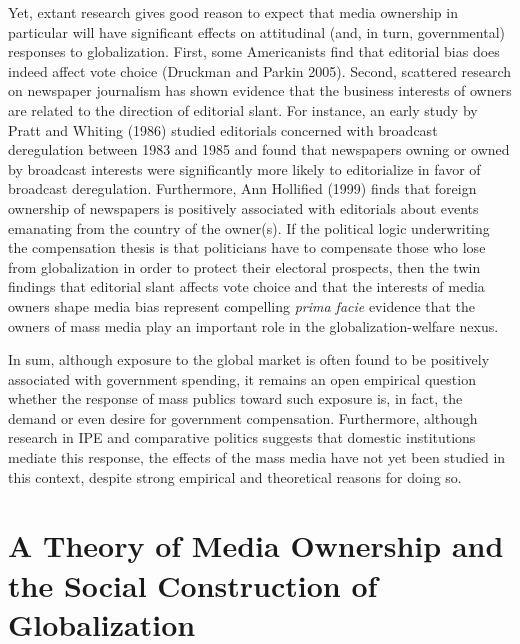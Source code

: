 \documentclass[12pt]{report}
\begin{document}
	Yet, extant research gives good reason to expect that media ownership in particular will have significant effects on attitudinal (and, in turn, governmental) responses to globalization. First, some Americanists find that editorial bias does indeed affect vote choice (Druckman and Parkin 2005). Second, scattered research on newspaper journalism has shown evidence that the business interests of owners are related to the direction of editorial slant. For instance, an early study by Pratt and Whiting (1986) studied editorials concerned with broadcast deregulation between 1983 and 1985 and found that newspapers owning or owned by broadcast interests were significantly more likely to editorialize in favor of broadcast deregulation. Furthermore, Ann Hollified (1999) finds that foreign ownership of newspapers is positively associated with editorials about events emanating from the country of the owner(s). If the political logic underwriting the compensation thesis is that politicians have to compensate those who lose from globalization in order to protect their electoral prospects, then the twin findings that editorial slant affects vote choice and that the interests of media owners shape media bias represent compelling \emph{prima facie} evidence that the owners of mass media play an important role in the globalization-welfare nexus.
	
	In sum, although exposure to the global market is often found to be positively associated with government spending, it remains an open empirical question whether the response of mass publics toward such exposure is, in fact, the demand or even desire for government compensation. Furthermore, although research in IPE and comparative politics suggests that domestic institutions mediate this response, the effects of the mass media have not yet been studied in this context, despite strong empirical and theoretical reasons for doing so.

\section{A Theory of Media Ownership and the Social Construction of Globalization}
\end{document}
